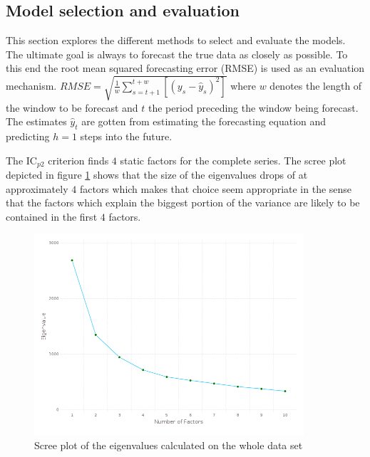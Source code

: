 \documentclass[12pt]{article}
\begin{document}
\subsection{Model selection and evaluation}
This section explores the different methods to select and evaluate the models. The ultimate goal is always to forecast the true data as closely as possible. To this end the root mean squared forecasting error (RMSE) is used as an evaluation mechanism. $RMSE = \sqrt{\frac{1}{w}\sum_{s=t+1}^{t+w}[(y_s - \hat y_s)^2]}$ where $w$ denotes the length of the window to be forecast and $t$ the period preceding the window being forecast. The estimates $\hat y_t$ are gotten from estimating the forecasting equation and predicting $h=1$ steps into the future.

The IC$_{p2}$ criterion finds $4$ static factors for the complete series. The scree plot depicted in figure \ref{screeplot} shows that the size of the eigenvalues drops of at approximately $4$ factors which makes that choice seem appropriate in the sense that the factors which explain the biggest portion of the variance are likely to be contained in the first $4$ factors.

\begin{figure}[htp]
\centering
\includegraphics[width=10cm]{graphs/screeplot.png}
\caption{Scree plot of the eigenvalues calculated on the whole data set}
\label{screeplot}
\end{figure}
\end{document}
